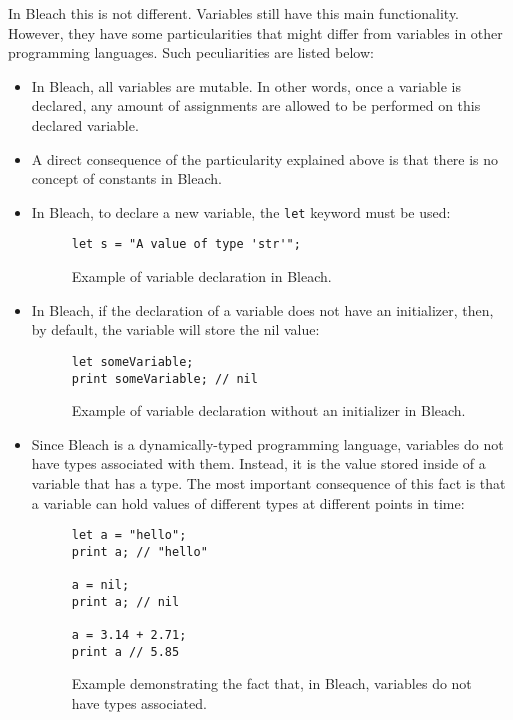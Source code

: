 In Bleach this is not different. Variables still have this main functionality. However, they have some particularities that might differ from variables in other programming languages. Such peculiarities are listed below:
\begin{itemize}
    \item In Bleach, all variables are mutable. In other words, once a variable is declared, any amount of assignments are allowed to be performed on this declared variable.
    
    \item A direct consequence of the particularity explained above is that there is no concept of constants in Bleach.
    
    \item In Bleach, to declare a new variable, the \texttt{let} keyword must be used:
    \begin{figure}[H]
        \centering
        \begin{lstlisting}
let s = "A value of type 'str'";
        \end{lstlisting}
        \caption{Example of variable declaration in Bleach.}
    \end{figure}
    
    \item In Bleach, if the declaration of a variable does not have an initializer, then, by default, the variable will store the nil value:
    \begin{figure}[H]
        \centering
        \begin{lstlisting}
let someVariable;
print someVariable; // nil
        \end{lstlisting}
        \caption{Example of variable declaration without an initializer in Bleach.}
    \end{figure}

    \item Since Bleach is a dynamically-typed programming language, variables do not have types associated with them. Instead, it is the value stored inside of a variable that has a type. The most important consequence of this fact is that a variable can hold values of different types at different points in time:
    \begin{figure}[H]
        \centering
        \begin{lstlisting}
let a = "hello";
print a; // "hello"

a = nil;
print a; // nil

a = 3.14 + 2.71;
print a // 5.85
        \end{lstlisting}
        \caption{Example demonstrating the fact that, in Bleach, variables do not have types associated.}
    \end{figure}
\end{itemize}

